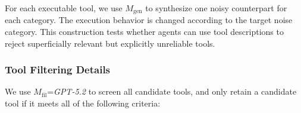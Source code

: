 \documentclass{llmxive}
\begin{document}
For each executable tool, we use $M_{\mathrm{gen}}$ to synthesize one noisy counterpart for each category.
The execution behavior is changed according to the target noise category.
This construction tests whether agents can use tool descriptions to reject superficially relevant but explicitly unreliable tools.

\subsubsection{Tool Filtering Details}
\label{app:detailed-filtering-criteria}


We use $M_{\mathrm{fil}}$=\textit{GPT-5.2} to screen all candidate tools, and only retain a candidate tool if it meets all of the following criteria:
\end{document}
